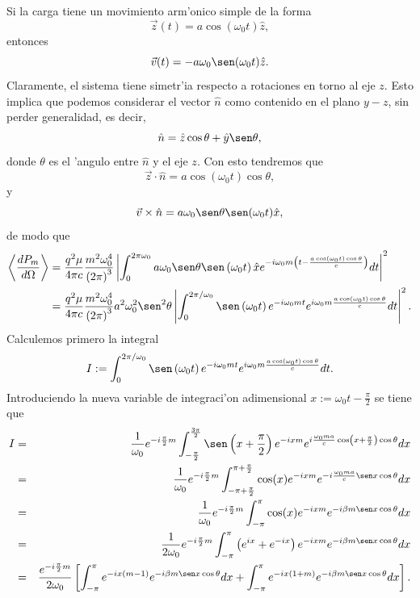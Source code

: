 Si la carga tiene un movimiento arm'onico simple de la forma
\begin{equation}
\vec{z}(t) =a\cos(\omega_0t)\hat{z},
\end{equation}
entonces
\begin{equation}
\vec{v}(t) =-a\omega_0\sen(\omega_0t)\hat{z}.
\end{equation}
Claramente, el sistema tiene simetr'ia respecto a rotaciones en torno al eje
$z$. Esto implica que podemos considerar el vector $\hat{n}$ como contenido en
el plano $y-z$, sin perder generalidad, es decir,
\begin{equation}
\hat{n}=\hat{z}\cos\theta+\hat{y}\sen\theta,
\end{equation}
donde $\theta$ es el 'angulo entre $\hat{n}$ y el eje $z$. Con esto tendremos
que
\begin{equation}
 \vec{z}\cdot\hat{n}=a\cos(\omega_0t)\cos\theta ,
\end{equation}
y
\begin{equation}
\vec{v}\times\hat{n}=a\omega_0\sen\theta\sen(\omega_0t)  \hat{x},
\end{equation}
de modo que
\begin{align}
\left\langle \frac{dP_{m}}{d\Omega}\right\rangle &=
\frac{q^2\mu}{4\pi c}\frac{m^2\omega_0^4}{\left(2\pi\right)^3}
\left| \int_0^{2\pi\omega_0}a\omega_0\sen\theta\sen\left(\omega_0t\right)
\hat{x}e^{-i\omega_0m\left(t-\frac{a\cos\left(\omega_0t\right)\cos\theta}{c}\right)}dt\right|^2\\
&=\frac{q^2\mu}{4\pi c}\frac{m^2\omega_0^4}{\left(2\pi\right)^3}
a^2\omega_0^2\sen^2\theta\left| \int_0^{2\pi/\omega_0}\sen\left(
\omega_0t\right) e^{-i\omega_0mt}e^{i\omega_0m\frac{a\cos\left(
\omega_0t\right)  \cos\theta}{c}}dt\right|^2 .  \label{promedioantescvar}
\end{align}
Calculemos primero la integral
\begin{equation}
I:=\int_0^{2\pi/\omega_0}\sen\left(\omega_0t\right)
e^{-i\omega_0mt}e^{i\omega_0m\frac{a\cos\left(  \omega_0t\right)
\cos\theta}{c}}dt.
\end{equation}
Introduciendo la nueva variable de integraci'on adimensional
$x:=\omega_0t-\frac{\pi}{2}$ se tiene que
\begin{eqnarray}
I&=&\frac{1}{\omega_0}e^{-i\frac{\pi}{2}m}\int_{-\frac{\pi}{2}}^{\frac{3\pi}{2}}
\sen\left(x+\frac{\pi}{2}\right)  e^{-ixm}e^{i\frac{\omega_0ma}{c}\cos\left(
x+\frac{\pi}{2}\right)  \cos\theta}dx \\
&=&\frac{1}{\omega_0}e^{-i\frac{\pi}{2}m}\int_{-\pi+\frac{\pi}{2}}^{\pi+\frac{\pi
}{2}}\cos(x)e^{-ixm}e^{-i\frac{\omega_0ma}{c}\sen x\cos\theta}dx\\
&=&\frac{1}{\omega_0}e^{-i\frac{\pi}{2}m}\int_{-\pi}^{\pi}\cos(x)
e^{-ixm}e^{-i\beta m\sen x\cos\theta}dx\\
&=&\frac{1}{2\omega_0}e^{-i\frac{\pi}{2}m}\int_{-\pi}^{\pi}\left(
e^{ix}+e^{-ix}\right)e^{-ixm}e^{-i\beta m\sen x\cos\theta}dx\\
&=&\frac{e^{-i\frac{\pi}{2}m}}{2\omega_0}\left[\int_{-\pi}^{\pi}e^{-ix\left(
m-1\right)}e^{-i\beta m\sen x\cos\theta}dx+\int_{-\pi}^{\pi}e^{-ix\left(
1+m\right)}e^{-i\beta m\sen x\cos\theta}dx\right]  .
\end{eqnarray}
